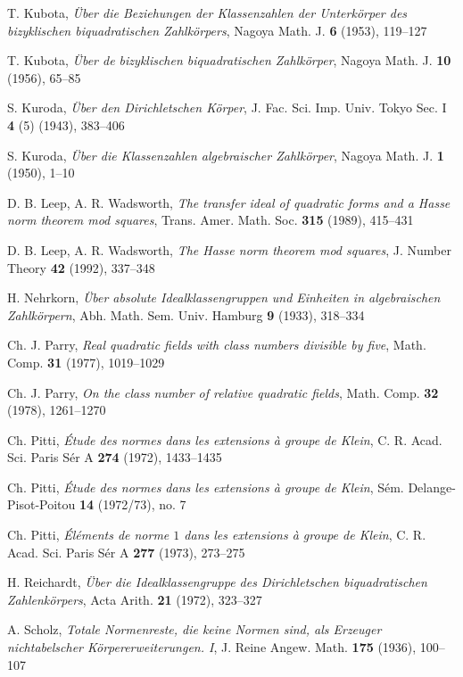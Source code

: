 \documentclass{amsart}
\begin{document}
\begin{thebibliography}{}
 T. Kubota,
{\em \"Uber die Beziehungen der Klassenzahlen der Unterk\"orper
  des bizyklischen biquadratischen Zahlk\"orpers},
Nagoya Math. J. {\bf 6} (1953), 119--127
%

 T. Kubota,
{\em \"Uber de bizyklischen biquadratischen Zahlk\"orper},
Nagoya Math. J. {\bf 10} (1956), 65--85
%

 S. Kuroda,
{\em \"Uber den Dirichletschen K\"orper},
J. Fac. Sci. Imp. Univ. Tokyo Sec. I {\bf 4} (5) (1943),
383--406
%

 S. Kuroda,
{\em \"Uber die Klassenzahlen algebraischer Zahlk\"orper},
Nagoya Math. J. {\bf 1} (1950), 1--10
%

 D. B. Leep, A. R. Wadsworth,
{\em The transfer ideal of quadratic forms and a Hasse norm
   theorem mod squares}, Trans. Amer. Math. Soc. {\bf 315}
(1989), 415--431
%

 D. B. Leep, A. R. Wadsworth,
{\em The Hasse norm theorem mod squares},
J. Number Theory {\bf 42} (1992), 337--348
%

 H. Nehrkorn,
{\em \"Uber absolute Idealklassengruppen und Einheiten
   in algebraischen Zahlk\"orpern},
Abh. Math. Sem. Univ. Hamburg {\bf 9} (1933), 318--334
%

 Ch. J. Parry,
{\em Real quadratic fields with class numbers divisible by five},
Math. Comp. {\bf 31} (1977), 1019--1029
%

 Ch. J. Parry,
{\em On the class number of relative quadratic fields},
Math. Comp. {\bf 32} (1978), 1261--1270
%

 Ch. Pitti,
{\em \'Etude des normes dans les extensions \`a groupe de
  Klein}, C. R. Acad. Sci. Paris S\'er A {\bf 274} (1972),
1433--1435
%

 Ch. Pitti,
{\em \'Etude des normes dans les extensions \`a groupe de
  Klein}, S\'em. Delange-Pisot-Poitou {\bf 14} (1972/73), no. 7
%

 Ch. Pitti,
{\em \'El\'ements de norme $1$ dans les extensions \`a groupe de
  Klein}, C. R. Acad. Sci. Paris S\'er A {\bf 277} (1973),
273--275
%

 H. Reichardt,
{\em \"Uber die Idealklassengruppe des Dirichletschen
   biquadratischen Zahlenk\"orpers},
Acta Arith. {\bf 21} (1972), 323--327
%

 A. Scholz,
{\em Totale Normenreste, die keine Normen sind, als Erzeuger
   nichtabelscher K\"orpererweiterungen. I},
J. Reine Angew. Math. {\bf 175} (1936), 100--107
%


\end{thebibliography}
\end{document}
